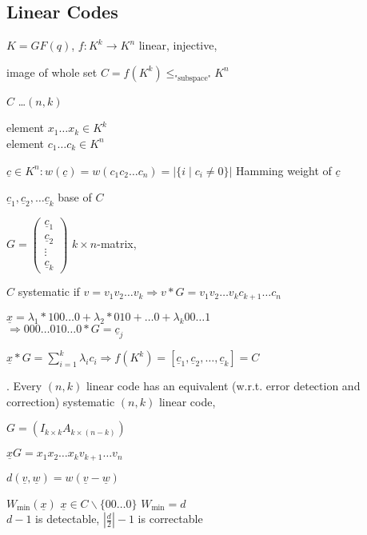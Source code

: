 \subsection{Linear Codes}
\begin{definition}
  $K = GF(q)$, $f:K^k \rightarrow K^n$ linear, injective,

  image of whole set $C = f(K^k) \leq_{\text{"subspace"}} K^n$

  $C$ \ldots $(n,k)$ 

  element $x_1\ldots x_k \in K^k$\\
  element $c_1\ldots c_k \in K^n$

  $\underline{c} \in K^n: w(\underline{c}) = w(c_1c_2 \ldots c_n) = |\{i \mid c_i \neq 0 \}|$ Hamming weight of $\underline{c}$

  $\underline{c}_1, \underline{c}_2, \ldots \underline{c}_k$ base of $C$

$G = \begin{pmatrix}\underline{c}_1\\ \underline{c}_2\\ \vdots \\ \underline{c}_k \end{pmatrix}$ $k\times n$-matrix, 

  $C$ systematic if $v = v_1v_2 \ldots v_k \Rightarrow v*G = v_1v_2 \ldots v_kc_{k+1}\ldots c_n$

  $\underline{x} = \lambda_1 * 100 \ldots 0 + \lambda_2 * 010 + \ldots 0 + \lambda_k 00\ldots 1$ \\
  $\Rightarrow 000\ldots 010 \ldots 0 * G = \underline{c}_j$

  $\underline{x}*G = \sum_{i=1}^k \lambda_i c_i \Rightarrow f(K^k) = [\underline{c}_1, \underline{c}_2, \ldots, \underline{c}_k ] = C$
\end{definition}

\Theorem.
Every $(n,k)$ linear code has an equivalent (w.r.t. error detection and correction) systematic $(n,k)$ linear code,

$G = (I_{k\times k} A_{k\times (n-k)})$

$\underline{x} G = x_1 x_2 \ldots x_k v_{k+1} \ldots v_n$

$d(\underline{v}, \underline{w}) = w(\underline{v}-\underline{w})$

$W_{\min}(\underline{x})$ $\underline{x} \in C \backslash \{00\ldots 0\}$ $W_{\min} = d$ \\
$d-1$ is detectable, $ \left|\frac{d}{2}\right| -1$ is correctable


